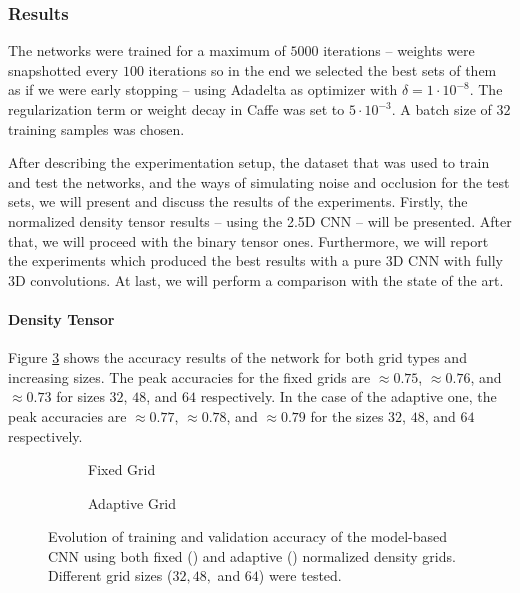 \subsubsection{Results}
\label{cha:objrecog:sec:study:subsec:experiments:subsubsec:results}

The networks were trained for a maximum of $5000$ iterations -- weights were snapshotted every $100$ iterations so in the end we selected the best sets of them as if we were early stopping -- using Adadelta as optimizer with $\delta = 1\cdot10^{-8}$. The regularization term or weight decay in Caffe was set to $5\cdot10^{-3}$. A batch size of $32$ training samples was chosen.

After describing the experimentation setup, the dataset that was used to train and test the networks, and the ways of simulating noise and occlusion for the test sets, we will present and discuss the results of the experiments. Firstly, the normalized density tensor results -- using the \acs{2.5D} \acs{CNN} -- will be presented. After that, we will proceed with the binary tensor ones. Furthermore, we will report the experiments which produced the best results with a pure \acs{3D} \acs{CNN} with fully \acs{3D} convolutions. At last, we will perform a comparison with the state of the art.

\paragraph{Density Tensor}

Figure \ref{fig:objrecog:3dcnn:experiments:25d_density} shows the accuracy results of the network for both grid types and increasing sizes. The peak accuracies for the fixed grids are $\approx0.75$, $\approx0.76$, and $\approx0.73$ for sizes $32$, $48$, and $64$ respectively. In the case of the adaptive one, the peak accuracies are $\approx0.77$, $\approx0.78$, and $\approx0.79$ for the sizes $32$, $48$, and $64$ respectively.

\begin{figure}[!b]
	\centering
	\begin{subfigure}{0.49\textwidth}
		
		\caption{Fixed Grid}
		\label{subfig:objrecog:3dcnn:experiments:25d_fixed_density}
	\end{subfigure}
	\begin{subfigure}{0.49\textwidth}
		
		\caption{Adaptive Grid}
		\label{subfig:objrecog:3dcnn:experiments:25d_adaptive_density}
	\end{subfigure}
	\caption{Evolution of training and validation accuracy of the model-based \acs{CNN} using both fixed () and adaptive () normalized density grids. Different grid sizes ($32, 48, $ and $64$) were tested.}
	\label{fig:objrecog:3dcnn:experiments:25d_density}
\end{figure}

